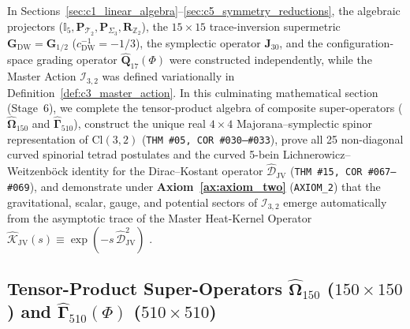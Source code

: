 \documentclass[11pt,a4paper]{article}
\newcommand{\catD}{\text{\textbf{\textcolor{blue!75!black}{[D]}}}}
\theoremstyle{definition}
\theoremstyle{plain}
\theoremstyle{remark}
\begin{document}
In Sections~\ref{sec:c1_linear_algebra}--\ref{sec:c5_symmetry_reductions}, the algebraic projectors ($\mathbb{I}_5, \mathbf{P}_{\mathcal{T}_2}, \mathbf{P}_{\Sigma_3}, \mathbf{R}_{\mathbb{Z}_2}$), the $15\times 15$ trace-inversion supermetric $\mathbf{G}_{\mathrm{DW}} = \mathbf{G}_{1/2}$ ($c_{\mathrm{DW}}^{-1}=-1/3$), the symplectic operator $\mathbf{J}_{30}$, and the configuration-space grading operator $\widehat{\mathbf{Q}}_{17}(\Phi)$ were constructed independently, while the Master Action $\mathcal{I}_{3,2}$ was defined variationally in Definition~\ref{def:c3_master_action}. In this culminating mathematical section (Stage~6), we complete the tensor-product algebra of composite super-operators ($\widehat{\mathbf{\Omega}}_{150}$ and $\widehat{\mathbf{\Gamma}}_{510}$), construct the unique real $4\times 4$ Majorana--symplectic spinor representation of $\mathrm{Cl}(3,2)$ (\texttt{THM~\#05, COR~\#030--\#033}), prove all 25 non-diagonal curved spinorial tetrad postulates and the curved 5-bein Lichnerowicz--Weitzenb\"ock identity for the Dirac--Kostant operator $\widehat{\mathcal{D}}_{\mathrm{JV}}$ (\texttt{THM~\#15, COR~\#067--\#069}), and demonstrate under \textbf{Axiom~\ref{ax:axiom_two}} (\texttt{AXIOM\_2}) that the gravitational, scalar, gauge, and potential sectors of $\mathcal{I}_{3,2}$ emerge automatically from the asymptotic trace of the Master Heat-Kernel Operator $\widehat{\mathcal{K}}_{\mathrm{JV}}(s) \equiv \exp(-s\,\widehat{\mathcal{D}}_{\mathrm{JV}}^2)$ \catD.

\subsection{\texorpdfstring{Tensor-Product Super-Operators $\widehat{\mathbf{\Omega}}_{150}$ ($150\times 150$) and $\widehat{\mathbf{\Gamma}}_{510}(\Phi)$ ($510\times 510$)}{Tensor-Product Super-Operators Omega\_150 and Gamma\_510}}
\end{document}
